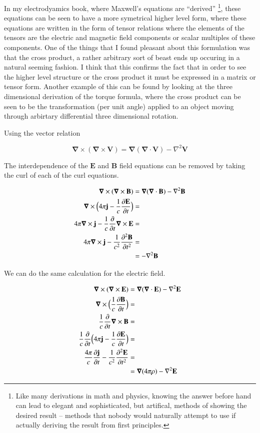 \documentclass{article}      %
\newcommand{\grad}[0]{\boldsymbol{\nabla}}
\newcommand{\curl}[0]{\grad \times}
\newcommand{\diverg}[0]{\grad \cdot}
\newcommand{\delsquared}[0]{\nabla^2}
\newcommand{\D}[2] {\frac {\partial #2} {\partial #1}}
\newcommand{\Dsq}[2] {\frac {\partial^2 #2} {\partial {#1}^2}}
\newcommand{\Bj}[0]{\mathbf{j}}
\newcommand{\BB}[0]{\mathbf{B}}
\newcommand{\BE}[0]{\mathbf{E}}
\newcommand{\BV}[0]{\mathbf{V}}
\begin{document}
In my electrodyamics book, where Maxwell's equations are ``derived''
\footnote
{
Like many derivations in math and physics, knowing the answer before hand
can lead to elegant and sophisticated, but artifical, methods of showing the desired result --
methods that
nobody would naturally attempt to use if actually deriving the result from first principles.
},
these equations can be seen to have a more symetrical higher level form, where
these equations are written in the form of tensor relations where
the elements of the tensors are the electric and magnetic field components 
or scalar multiples of these components.  One of the things that I found 
pleasant about this formulation was that the cross product, a rather 
arbitrary sort of beast ends up occuring in a natural seeming fashion.  I 
think that this confirms the fact that in order to see the higher level 
structure or the cross product it must be expressed in a matrix or tensor form.
Another example of this can be found by looking at the three dimensional 
derivation of the torque formula, where the 
cross product can be seen to be the transformation (per unit angle)
applied to an object moving through arbirtary differential three dimensional 
rotation.

Using the vector relation

\begin{equation*}
\curl (\curl \BV) = \grad (\diverg \BV) - \delsquared \BV
\end{equation*}

The interdependence of the $\BE$ and $\BB$ field equations can be removed by taking the
curl of each of the curl equations.

\begin{align*}
\curl (\curl \BB) 			&= \grad (\diverg \BB) - \delsquared \BB \\
\curl \Bigl(4\pi\Bj - \frac{1}{c} \D{t}{\BE} \Bigr) 	&= \\
4\pi\curl \Bj - \frac{1}{c} \D{t}{} \curl \BE 	&= \\
4\pi\curl \Bj - \frac{1}{c^2} \Dsq{t}{\BB} &= \\
      	     				&= - \delsquared \BB
\end{align*}

We can do the same calculation for the electric field.

\begin{align*}
\curl (\curl \BE) &= \grad (\diverg \BE) - \delsquared \BE \\
\curl \Bigl(\frac{1}{c} \D{t}{\BB}\Bigr) &= \\
\frac{1}{c} \D{t}{} \curl \BB &= \\
\frac{1}{c} \D{t}{} \Bigl(4\pi \Bj - \frac{1}{c} \D{t}{\BE} \Bigr) &= \\
\frac{4\pi}{c} \D{t}{\Bj} - \frac{1}{c^2} \Dsq{t}{\BE} &= \\
             &= \grad (4\pi\rho) - \delsquared \BE \\
\end{align*}
\end{document}
